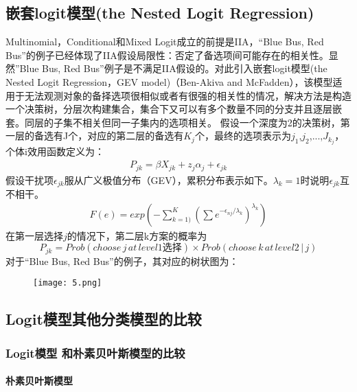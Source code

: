 \documentclass[cn]{elegantpaper}
\begin{document}
\subsection{嵌套logit模型(the Nested Logit Regression)}
Multinomial，Conditional和Mixed Logit成立的前提是IIA，“Blue Bus, Red Bus”的例子已经体现了IIA假设局限性：否定了备选项间可能存在的相关性。显然”Blue Bus, Red Bus”例子是不满足IIA假设的。对此引入嵌套logit模型(the Nested Logit Regression，GEV model)（Ben-Akiva and McFadden），该模型适用于无法观测对象的备择选项很相似或者有很强的相关性的情况，解决方法是构造一个决策树，分层次构建集合，集合下又可以有多个数量不同的分支并且逐层嵌套。同层的子集不相关但同一子集内的选项相关。
假设一个深度为2的决策树，第一层的备选有J个，对应的第二层的备选有$K_{j}$个，最终的选项表示为$j_{1}$,$j_{2}$,...,$J_{k_{j}}$，个体i效用函数定义为：
{\setlength\abovedisplayskip{5pt}
\setlength\belowdisplayskip{5pt}
\begin{equation} 
\begin{split}
P_{jk} = \beta X_{jk}+ z_{j}\alpha_{j} + \epsilon_{jk}
\end{split}
\end{equation}}
假设干扰项$\epsilon_{jk}$服从广义极值分布（GEV），累积分布表示如下。$\lambda_{k}=1$时说明$\epsilon_{jk}$互不相干。
{\setlength\abovedisplayskip{5pt}
\setlength\belowdisplayskip{5pt}
\begin{equation} 
\begin{split}
F(e) = exp(-\sum_{k=1)}^K({\sum{e^{-\epsilon_{nj}/\lambda_{k}}}})^{\lambda_{k}})
\end{split}
\end{equation}}
在第一层选择$j$的情况下，第二层k方案的概率为
\begin{equation} 
P_{jk} = Prob(choose\,j\,at\,level1选择)\times Prob(choose\,k\,at\,level2\,|\,j)
\end{equation}
对于“Blue Bus, Red Bus”的例子，其对应的树状图为：
\begin{figure}[H]
	\centering
	\texttt{[image: 5.png]}
\end{figure}

\subsection{Logit模型其他分类模型的比较}
\subsubsection{Logit模型 和朴素贝叶斯模型的比较}
\paragraph{朴素贝叶斯模型}
\end{document}
